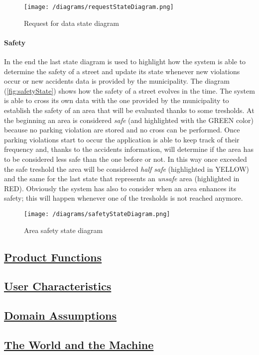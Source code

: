 		\begin{figure}[h]
			\centering
			\texttt{[image: /diagrams/requestStateDiagram.png]}
			\caption{\label{fig:requestState}Request for data state diagram}
		\end{figure}
	
	\paragraph{Safety}
	In the end the last state diagram is used to highlight how the system is able to determine the safety of a street and update its state whenever new violations occur or new accidents data is provided by the municipality. 
	The diagram (\autoref{fig:safetyState}) shows how the safety of a street evolves in the time. The system is able to cross its own data with the one provided by the municipality to establish the safety of an area that will be evaluated thanks to some tresholds. At the beginning an area is considered \textit{safe} (and highlighted with the GREEN color) because no parking violation are stored and no cross can be performed. Once parking violations start to occur the application is able to keep track of their frequency and, thanks to the accidents information, will determine if the area has to be considered less safe than the one before or not. In this way once exceeded the safe treshold the area will be considered \textit{half safe} (highlighted in YELLOW) and the same for the last state that represents an \textit{unsafe} area (highlighted in RED). Obviously the system has also to consider when an area enhances its safety; this will happen whenever one of the tresholds is not reached anymore. 
	
	\begin{figure}[h]
		\centering
		\texttt{[image: /diagrams/safetyStateDiagram.png]}
		\caption{\label{fig:safetyState}Area safety state diagram}
	\end{figure}   

	
\subsection[Product Functions]{\hyperlink{toc}{Product Functions}}

\subsection[User Characteristics]{\hyperlink{toc}{User Characteristics}}

\subsection[Domain Assumptions]{\hyperlink{toc}{Domain Assumptions}}

\subsection[The World and the Machine]{\hyperlink{toc}{The World and the Machine}}